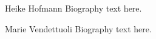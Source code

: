 % 

\begin{IEEEbiography}{Heike Hofmann}
Biography text here.
\end{IEEEbiography}

\begin{IEEEbiography}{Marie Vendettuoli}
Biography text here.
\end{IEEEbiography}

%
%






